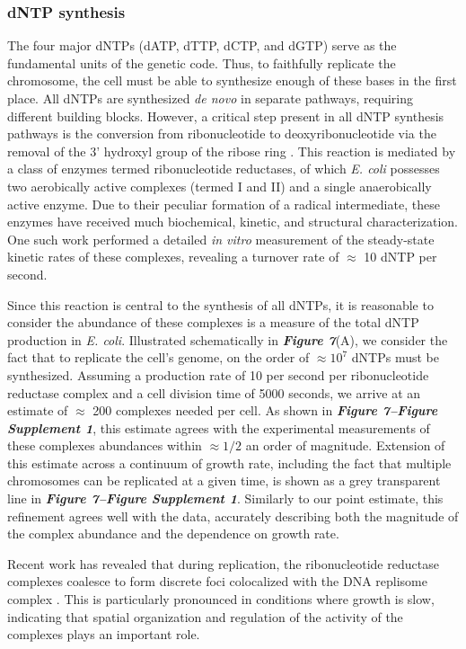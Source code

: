 \subsubsection{dNTP synthesis}
The four major dNTPs (dATP, dTTP, dCTP, and dGTP) serve as the fundamental
units of the genetic code. Thus, to faithfully replicate the chromosome, the
cell must be able to synthesize enough of these bases in the first place. All
dNTPs are synthesized \textit{de novo} in separate pathways, requiring
different building blocks. However, a critical step present in all dNTP
synthesis pathways is the conversion from ribonucleotide to
deoxyribonucleotide via the removal of the 3' hydroxyl group of the ribose
ring \citep{rudd2016}. This reaction is mediated by a class of enzymes termed
ribonucleotide reductases, of which \textit{E. coli} possesses two
aerobically active complexes (termed I and II) and a single anaerobically
active enzyme. Due to their peculiar formation of a radical intermediate,
these enzymes have received much biochemical, kinetic, and structural
characterization. One such work \citep{ge2003} performed a detailed
\textit{in vitro} measurement of the steady-state kinetic rates of these
complexes, revealing a turnover rate of $\approx$ 10 dNTP per second.

Since this reaction is central to the synthesis of all dNTPs, it is
reasonable to consider the abundance of these complexes is a measure of the
total dNTP production in \textit{E. coli}. Illustrated schematically in
\textbf{\textit{Figure 7}}(A), we consider the fact that to replicate the cell's
genome, on the order of $\approx 10^7$ dNTPs must be synthesized. Assuming a
production rate of 10 per second per ribonucleotide reductase complex and a
cell division time of 5000 seconds, we arrive at an estimate of $\approx$ 200
complexes needed per cell. As shown in \textbf{\textit{Figure 7–Figure Supplement 1}}, this estimate agrees with the experimental measurements of these
complexes abundances within $\approx 1/2$ an order of magnitude. Extension of
this estimate across a continuum of growth rate, including the fact that
multiple chromosomes can be replicated at a given time, is shown as a grey
transparent line in \textbf{\textit{Figure 7–Figure Supplement 1}}. Similarly to our point estimate, this
refinement agrees well with the data, accurately describing both the
magnitude of the complex abundance and the dependence on growth rate.

Recent work has revealed that during replication, the ribonucleotide
reductase complexes coalesce to form discrete foci colocalized with the DNA
replisome complex \citep{sanchez-romero2011}. This is particularly pronounced
in conditions where growth is slow, indicating that spatial organization and
regulation of the activity of the complexes plays an important role.

